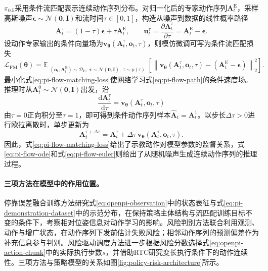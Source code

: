\(\pi_{0.5}\)采用条件流匹配表示连续动作序列分布\cite{black2024pi0,black2025pi05}。对归一化后的专家动作序列\(\mathbf A_t^{\mathrm E}\)，采样高斯噪声\(\boldsymbol\epsilon\sim\mathcal N(\mathbf 0,\mathbf I)\)和流时间\(\tau\in[0,1]\)，构造从噪声到数据的线性概率路径
\begin{equation}
  \mathbf A_t^{\tau}
  =
  (1-\tau)\boldsymbol\epsilon
  +
  \tau\mathbf A_t^{\mathrm E},
  \qquad
  \mathbf u_t^{\tau}
  =
  \frac{\partial\mathbf A_t^{\tau}}{\partial\tau}
  =
  \mathbf A_t^{\mathrm E}-\boldsymbol\epsilon.
  \label{eq:pi-flow-path}
\end{equation}
设动作专家输出的条件向量场为\(\mathbf v_{\boldsymbol\theta}(\mathbf A_t^{\tau},\mathbf o_t,\tau)\)，则模仿微调可写为条件流匹配损失
\begin{equation}
  \mathcal L_{\mathrm{FM}}(\boldsymbol\theta)
  =
  \mathbb E_{\substack{
    (\mathbf o_t,\mathbf A_t^{\mathrm E})\sim\mathcal D_{\mathrm E},\;
    \boldsymbol\epsilon\sim\mathcal N(\mathbf 0,\mathbf I),\;
    \tau\sim p(\tau)}}
  \left[
    \left\|
      \mathbf v_{\boldsymbol\theta}
      (\mathbf A_t^{\tau},\mathbf o_t,\tau)
      -
      (\mathbf A_t^{\mathrm E}-\boldsymbol\epsilon)
    \right\|_2^2
  \right].
  \label{eq:pi-flow-matching-loss}
\end{equation}
最小化式\eqref{eq:pi-flow-matching-loss}使网络学习式\eqref{eq:pi-flow-path}的条件速度场。推理时从\(\mathbf A_t^{0}\sim\mathcal N(\mathbf 0,\mathbf I)\)出发，沿
\begin{equation}
  \frac{\mathrm d\mathbf A_t^{\tau}}{\mathrm d\tau}
  =
  \mathbf v_{\boldsymbol\theta}
  (\mathbf A_t^{\tau},\mathbf o_t,\tau)
  \label{eq:pi-flow-ode}
\end{equation}
由\(\tau=0\)正向积分至\(\tau=1\)，即可得到条件动作序列样本\(\widehat{\mathbf A}_t=\mathbf A_t^1\)。以步长\(\Delta\tau>0\)进行欧拉离散时，单步更新为
\begin{equation}
  \mathbf A_t^{\tau+\Delta\tau}
  =
  \mathbf A_t^{\tau}
  +
  \Delta\tau\,
  \mathbf v_{\boldsymbol\theta}
  (\mathbf A_t^{\tau},\mathbf o_t,\tau).
  \label{eq:pi-flow-euler}
\end{equation}
因此，式\eqref{eq:pi-flow-matching-loss}给出了示教动作对模型参数的监督关系，式\eqref{eq:pi-flow-ode}和式\eqref{eq:pi-flow-euler}则给出了从随机噪声生成连续动作序列的推理过程。

\paragraph{三项方法在模型中的作用位置。}停靠误差融合训练方法研究式\eqref{eq:openpi-observation}中的状态表征与式\eqref{eq:pi-demonstration-dataset}中的示范分布，在保持策略主体结构与流匹配训练目标不变的条件下，考察相对位姿信息对动作学习的影响。风险判别方法联合利用观测、动作与增广状态，在动作序列下发前估计失败风险；相邻动作序列的预测偏差作为补充信息参与判别。风险驱动调度方法进一步根据风险分数选择式\eqref{eq:openpi-action-chunk}中的实际执行步数\(s\)，并借助RTC研究变长执行条件下的动作连续性。三项方法与策略模型的关系如图\ref{fig:policy-risk-architecture}所示。


